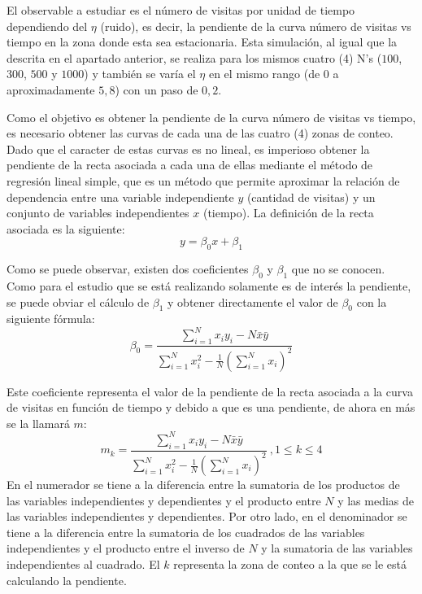 \documentclass[11pt]{article}
\begin{document}
            El observable a estudiar es el número de visitas por unidad de tiempo dependiendo del $\eta$ (ruido), es decir,
            la pendiente de la curva número de visitas vs tiempo en la zona donde esta sea estacionaria.
            Esta simulación, al igual que la descrita en el apartado anterior, se realiza para los mismos cuatro (4) N's
            ($100$, $300$, $500$ y $1000$) y también se varía el $\eta$ en el mismo rango (de $0$ a aproximadamente $5,8$)
            con un paso de $0,2$.

            Como el objetivo es obtener la pendiente de la curva número de visitas vs tiempo, es necesario obtener las curvas
            de cada una de las cuatro (4) zonas de conteo. Dado que el caracter de estas curvas es no lineal, es imperioso
            obtener la pendiente de la recta asociada a cada una de ellas mediante el método de regresión lineal simple, que
            es un método que permite aproximar la relación de dependencia entre una variable independiente $y$ (cantidad de visitas)
            y un conjunto de variables independientes $x$ (tiempo). La definición de la recta asociada es la siguiente:
            \begin{equation}
                y = \beta_0 x + \beta_1
            \end{equation}

            Como se puede observar, existen dos coeficientes $\beta_0$ y $\beta_1$ que no se conocen. Como para el estudio que se
            está realizando solamente es de interés la pendiente, se puede obviar el cálculo de $\beta_1$ y obtener directamente
            el valor de $\beta_0$ con la siguiente fórmula:
            \begin{equation}
                \beta_0 = \frac{\sum_{i=1}^N x_i y_i - N\bar{x} \bar{y}}{\sum_{i=1}^N x_i^2 - \frac{1}{N} \left(\sum_{i=1}^N x_i \right)^2}
            \end{equation}

            Este coeficiente representa el valor de la pendiente de la recta asociada a la curva de visitas en función de tiempo y
            debido a que es una pendiente, de ahora en más se la llamará $m$:
            \begin{equation}
                m_k = \frac{\sum_{i=1}^N x_i y_i - N\bar{x} \bar{y}}{\sum_{i=1}^N x_i^2 - \frac{1}{N} \left(\sum_{i=1}^N x_i \right)^2}
                \ , 1 \leq k \leq 4
            \end{equation}
            En el numerador se tiene a la diferencia entre la sumatoria de los productos de las variables independientes y dependientes
            y el producto entre $N$ y las medias de las variables independientes y dependientes.
            Por otro lado, en el denominador se tiene a la diferencia entre la sumatoria de los cuadrados de las variables independientes
            y el producto entre el inverso de $N$ y la sumatoria de las variables independientes al cuadrado. El $k$ representa la zona
            de conteo a la que se le está calculando la pendiente.
\end{document}
